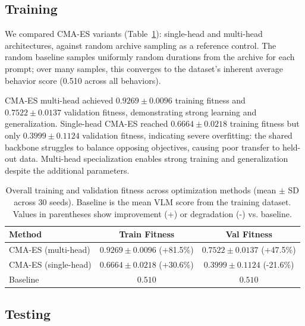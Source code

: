 \documentclass{article}
\begin{document}
\subsection{Training}
\label{sec:results-training}

We compared CMA-ES variants (Table~\ref{tab:training_overall}): single-head and multi-head architectures, against random archive sampling as a reference control. The random baseline samples uniformly random durations from the archive for each prompt; over many samples, this converges to the dataset's inherent average behavior score (0.510 across all behaviors).

CMA-ES multi-head achieved $0.9269 \pm 0.0096$ training fitness and $0.7522 \pm 0.0137$ validation fitness, demonstrating strong learning and generalization. Single-head CMA-ES reached $0.6664 \pm 0.0218$ training fitness but only $0.3999 \pm 0.1124$ validation fitness, indicating severe overfitting: the shared backbone struggles to balance opposing objectives, causing poor transfer to held-out data. Multi-head specialization enables strong training and generalization despite the additional parameters.

\begin{table}[h]
\centering
\caption{Overall training and validation fitness across optimization methods (mean $\pm$ SD across 30 seeds). Baseline is the mean VLM score from the training dataset. Values in parentheses show improvement (+) or degradation (-) vs. baseline.}
\label{tab:training_overall}
\begin{tabular}{lcc}
\toprule
Method & Train Fitness & Val Fitness \\
\midrule
CMA-ES (multi-head) & $0.9269 \pm 0.0096$ (+81.5\%) & $0.7522 \pm 0.0137$ (+47.5\%) \\
CMA-ES (single-head) & $0.6664 \pm 0.0218$ (+30.6\%) & $0.3999 \pm 0.1124$ (-21.6\%) \\
Baseline & $0.510$ & $0.510$ \\
\bottomrule
\end{tabular}
\end{table}





\subsection{Testing}
\label{sec:testing}
\end{document}

